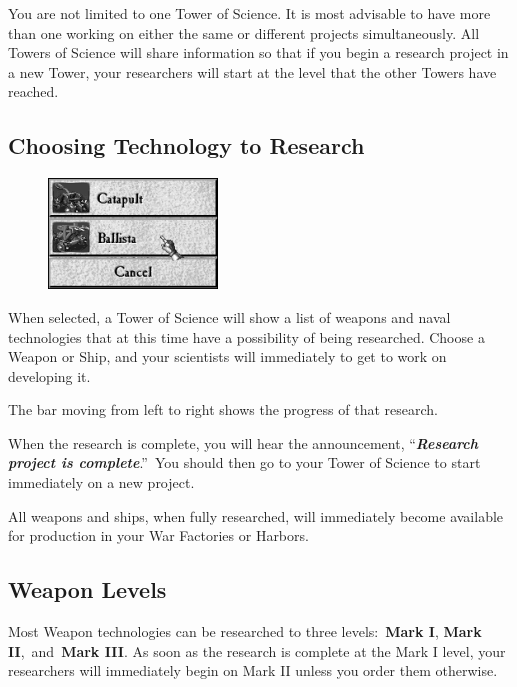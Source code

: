 You are not limited to one Tower of Science. It is most advisable to have more than one working on either the same or different projects simultaneously. All Towers of Science will share information so that if you begin a research project in a new Tower, your researchers will start at the level that the other Towers have reached.

\clearpage

\subsection{Choosing Technology to Research}

\begin{figure}
	\vspace{-20pt}
	\begin{center}
		\includegraphics[width=0.4\textwidth]{Iresearch_begin}
	\end{center}
	\vspace{-20pt}
\end{figure}

When selected, a Tower of Science will show a list of weapons and naval technologies that at this time have a possibility of being researched. Choose a Weapon or Ship, and your scientists will immediately to get to work on developing it.

The bar moving from left to right shows the progress of that research.

When the research is complete, you will hear the announcement, “\textbf{\textit{Research project is complete}}.” You should then go to your Tower of Science to start immediately on a new project.

All weapons and ships, when fully researched, will immediately become available for production in your War Factories or Harbors.

\subsection{Weapon Levels}

Most Weapon technologies can be researched to three levels: \textbf{Mark I}, \textbf{Mark II}, and \textbf{Mark III}. As soon as the research is complete at the Mark I level, your researchers will immediately begin on Mark II unless you order them otherwise.


